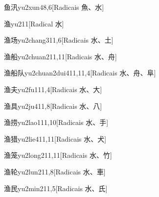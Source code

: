\begin{entry}{鱼汛}{yu2xun4}{8,6}[Radicais ⿂、⽔]
\end{entry}

\begin{entry}{渔}{yu2}{11}[Radical ⽔]
\end{entry}

\begin{entry}{渔场}{yu2chang3}{11,6}[Radicais ⽔、⼟]
\end{entry}

\begin{entry}{渔船}{yu2chuan2}{11,11}[Radicais ⽔、⾈]
\end{entry}

\begin{entry}{渔船队}{yu2chuan2dui4}{11,11,4}[Radicais ⽔、⾈、⾩]
\end{entry}

\begin{entry}{渔夫}{yu2fu1}{11,4}[Radicais ⽔、⼤]
\end{entry}

\begin{entry}{渔具}{yu2ju4}{11,8}[Radicais ⽔、⼋]
\end{entry}

\begin{entry}{渔捞}{yu2lao1}{11,10}[Radicais ⽔、⼿]
\end{entry}

\begin{entry}{渔猎}{yu2lie4}{11,11}[Radicais ⽔、⽝]
\end{entry}

\begin{entry}{渔笼}{yu2long2}{11,11}[Radicais ⽔、⽵]
\end{entry}

\begin{entry}{渔轮}{yu2lun2}{11,8}[Radicais ⽔、⾞]
\end{entry}

\begin{entry}{渔民}{yu2min2}{11,5}[Radicais ⽔、⽒]
\end{entry}

